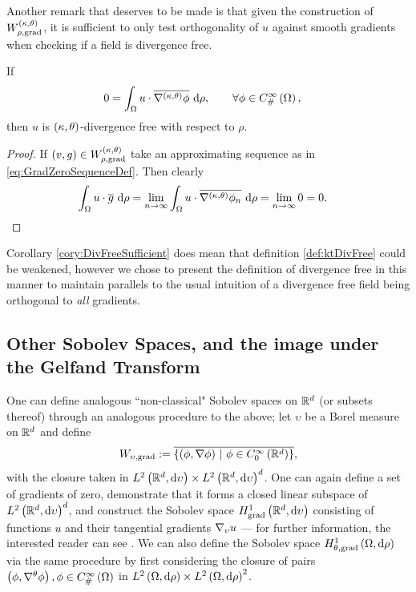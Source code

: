 Another remark that deserves to be made is that given the construction of $W^{\left( \kappa, \theta \right)}_{\rho,\mathrm{grad}}$, it is sufficient to only test orthogonality of $u$ against smooth gradients when checking if a field is divergence free.
\begin{cory} \label{cory:DivFreeSufficient}
	If
	\begin{align*}
		0 &= \int_{\Omega} u\cdot\overline{\nabla^{\left( \kappa, \theta \right)}\phi}  \ \mathrm{d}\rho, \qquad\forall\phi\in C^{\infty}_{\#}\left( \Omega \right),
	\end{align*}
	then $u$ is $\left( \kappa, \theta \right)$-divergence free with respect to $\rho$.
\end{cory}
\begin{proof}
	If $\left( v,g \right)\in W^{\left( \kappa, \theta \right)}_{\rho,\mathrm{grad}}$ take an approximating sequence as in \eqref{eq:GradZeroSequenceDef}.
	Then clearly
	\begin{align*}
		\int_{\Omega} u\cdot\overline{g}  \ \mathrm{d}\rho 
		&= \lim_{n\rightarrow\infty}\int_{\Omega} u\cdot\overline{\nabla^{\left( \kappa, \theta \right)}\phi_n}  \ \mathrm{d}\rho
		= \lim_{n\rightarrow\infty} 0 = 0.
	\end{align*}
\end{proof}
Corollary \ref{cory:DivFreeSufficient} does mean that definition \ref{def:ktDivFree} could be weakened, however we chose to present the definition of divergence free in this manner to maintain parallels to the usual intuition of a divergence free field being orthogonal to \emph{all} gradients.

\subsection{Other Sobolev Spaces, and the image under the Gelfand Transform} \label{ssec:SobSpacesAndGelfand}
One can define analogous ``non-classical" Sobolev spaces on $\mathbb{R}^d$ (or subsets thereof) through an analogous procedure to the above; let $\upsilon$ be a Borel measure on $\mathbb{R}^d$ and define 
\begin{align*}
	W_{\upsilon,\mathrm{grad}} := \overline{ \left\{  \left( \phi, \nabla\phi \right) \ \middle\vert \  \phi\in C^{\infty}_{0}\left( \mathbb{R}^d \right)  \right\} },
\end{align*}
with the closure taken in $L^{2}\left( \mathbb{R}^d,\mathrm{d}\upsilon \right)\times L^{2}\left( \mathbb{R}^d,\mathrm{d}\upsilon \right)^d$.
One can again define a set of gradients of zero, demonstrate that it forms a closed linear subspace of $L^{2}\left( \mathbb{R}^d,\mathrm{d}\upsilon \right)^d$, and construct the Sobolev space $H^1_\mathrm{grad}\left( \mathbb{R}^d, \mathrm{d}\upsilon \right)$ consisting of functions $u$ and their tangential gradients $\nabla_{\upsilon}u$ --- for further information, the interested reader can see .
We can also define the Sobolev space $H^1_{\theta, \mathrm{grad}}\left( \Omega, \mathrm{d}\rho \right)$ via the same procedure by first considering the closure of pairs $\left( \phi, \nabla^{\theta}\phi \right), \phi\in C^{\infty}_{\#}\left( \Omega \right)$ in $L^{2}\left( \Omega,\mathrm{d}\rho \right)\times L^{2}\left( \Omega,\mathrm{d}\rho \right)^2$.

